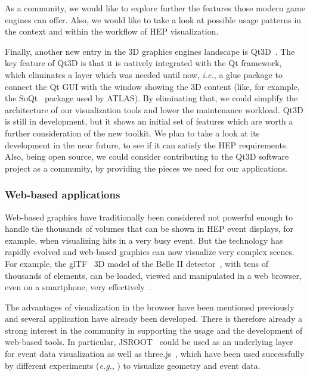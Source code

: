 \documentclass[12pt,a4paper]{article}
\begin{document}
As a community, we would like to explore further the features those modern game engines can offer. Also, we would like to take a
look at possible usage patterns in the context and within the workflow of HEP visualization.

Finally, another new entry in the 3D graphics engines landscape is Qt3D~\cite{Qt3d}. The key feature of Qt3D is that it is natively integrated with the Qt framework, which eliminates a layer which was needed until now, \textit{i.e.}, a glue
package to connect the Qt GUI with the window showing the 3D content (like, for example, the SoQt~\cite{soqt} package used by ATLAS). By eliminating that, we could simplify the architecture
of our visualization tools and lower the maintenance workload. Qt3D is still in development, but it shows an initial set of
features which are worth a further consideration of the new toolkit. We plan to take a look at its development in the near future,
to see if it can satisfy the HEP requirements. Also, being open source, we could consider contributing to the Qt3D software
project as a community, by providing the pieces we need for our applications.

\hypertarget{web-based}{%
\subsubsection{Web-based applications}\label{web-based}}

Web-based graphics have traditionally been considered not powerful enough to handle the thousands of volumes that can be
shown in HEP event displays, for example, when visualizing hits in a very busy event. But the technology has rapidly
evolved and web-based graphics can now visualize very complex scenes.
For example, the glTF~\cite{glTF} 3D model of the Belle II detector~\cite{BelleII}, with tens of thousands of elements,
can be loaded, viewed and manipulated in a web browser, even on a smartphone, very effectively~\cite{SketchFabBelleII}.


The advantages of visualization in the browser have been mentioned
previously and several application have already been developed.
There is therefore already a strong interest in the community in supporting the usage and the development of web-based tools.
In particular, JSROOT~\cite{rootjs} could be used as an
underlying layer for event data visualization as well as three.js~\cite{ThreeJS}, which have been
used successfully by different experiments (\textit{e.g.}, \cite{ATLASTada2016,ATLASTracer2015,CMSISpyWebGL}) to visualize geometry and event data.
\end{document}
